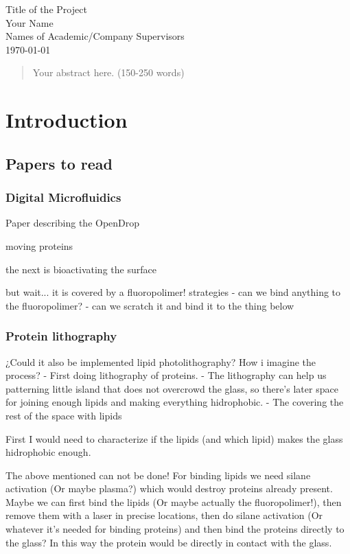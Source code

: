 \documentclass[12pt]{article}
\begin{document}
\begin{titlepage}
    \centering
    \vspace*{60px}
    \huge{Title of the Project}\\
    \vspace{10px}
    \large{Your Name}\\
    \large{Names of Academic/Company Supervisors}\\
    \vfill
    \today
    \vfill
\end{titlepage}

\newpage
\begin{abstract}
\noindent
Your abstract here. (150-250 words)
\end{abstract}

\newpage
\section*{Introduction}
\subsection*{Papers to read}
\subsubsection*{Digital Microfluidics}

Paper describing the OpenDrop

moving proteins

the next is bioactivating the surface

but wait... it is covered by a fluoropolimer!
strategies
 - can we bind anything to the fluoropolimer?
  - can we scratch it and bind it to the thing below


\subsubsection*{Protein lithography}
¿Could it also be implemented lipid photolithography?
How i imagine the process?
 - First doing lithography of proteins. 
      - The lithography can help us patterning little island that does not overcrowd the glass, so there's later space for joining enough lipids and making everything hidrophobic.
 - The covering the rest of the space with lipids

 First I would need to characterize if the lipids (and which lipid) makes the glass hidrophobic enough.

 The above mentioned can not be done! For binding lipids we need silane activation (Or maybe plasma?) which would destroy proteins already present.
 Maybe we can first bind the lipids (Or maybe actually the fluoropolimer!), then remove them with a laser in precise locations, then do silane activation 
 (Or whatever it's needed for binding proteins) and then bind the proteins directly to the glass? In this way the protein would be directly in contact with the glass.
\end{document}
